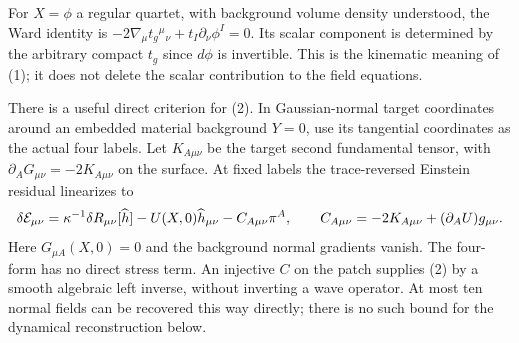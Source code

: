 For \(X=\phi\) a regular quartet, with background volume density understood, the Ward identity is
\(-2\nabla_\mu t_g{}^\mu{}_\nu+t_I\partial_\nu\phi^I=0\).
Its scalar component is determined by the arbitrary compact \(t_g\) since \(d\phi\) is invertible. This is the kinematic meaning of (1); it does not delete the scalar contribution to the field equations.

There is a useful direct criterion for (2). In Gaussian-normal target coordinates around an embedded material background \(Y=0\), use its tangential coordinates as the actual four labels. Let \(K_{A\mu\nu}\) be the target second fundamental tensor, with \(\partial_A G_{\mu\nu}=-2K_{A\mu\nu}\) on the surface. At fixed labels the trace-reversed Einstein residual linearizes to
\begin{equation}\label{eq:direct}
 \delta{\cal E}_{\mu\nu}
   =\kappa^{-1}\delta R_{\mu\nu}[\widehat h]
     -U(X,0)\widehat h_{\mu\nu}-C_{A\mu\nu}\pi^A,\qquad
 C_{A\mu\nu}=-2K_{A\mu\nu}+(\partial_AU)g_{\mu\nu}.
\end{equation}
Here \(G_{\mu A}(X,0)=0\) and the background normal gradients vanish. The four-form has no direct stress term. An injective \(C\) on the patch supplies (2) by a smooth algebraic left inverse, without inverting a wave operator. At most ten normal fields can be recovered this way directly; there is no such bound for the dynamical reconstruction below.
